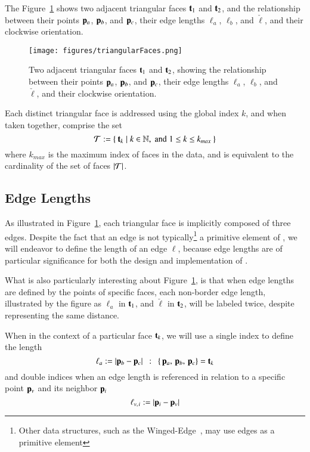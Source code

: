 The Figure~\ref{fig:triangularFaces} shows two adjacent triangular faces $\mathbf{t}_1$ and $\mathbf{t}_2$, and the relationship between their points $\mathbf{p}_a$, $\mathbf{p}_b$, and $\mathbf{p}_c$, their edge lengths $\ell_a$, $\ell_b$, and $\check{\ell}$, and their clockwise orientation.

\begin{figure}
\ffigbox
	{\texttt{[image: figures/triangularFaces.png]}}
	{\caption[Two Triangular Faces]{Two adjacent triangular faces $\mathbf{t}_1$ and $\mathbf{t}_2$, showing the relationship between their points $\mathbf{p}_a$, $\mathbf{p}_b$, and $\mathbf{p}_c$, their edge lengths $\ell_a$, $\ell_b$, and $\check{\ell}$, and their clockwise orientation.}\label{fig:triangularFaces}}
\end{figure}

Each distinct triangular face is addressed using the global index $k$, and when taken together, comprise the set
%
\begin{equation}
	\mathcal{T} := \left \{\:\mathbf{t}_k \mid k \in \mathbb{N}, \;\text{and}\; 1\leq k \leq k_{max}\:\right \}
	\label{eq:defineSetOfFaces}
\end{equation}
%
where $k_{max}$ is the maximum index of faces in the data, and is equivalent to the cardinality of the set of faces $|\mathcal{T}|$.%
%
%

%
%
%
\subsection{Edge Lengths}
\label{ch2s3ssEL}
As illustrated in Figure~\ref{fig:triangularFaces}, each triangular face is implicitly composed of three edges. Despite the fact that an edge is not typically\footnote{Other data structures, such as the Winged-Edge~\cite[p.~1]{Baumgart75}, may use edges as a primitive element} a primitive element of \tdd{}, we will endeavor to define the length of an edge $\ell$, because edge lengths are of particular significance for both the design and implementation of .

What is also particularly interesting about Figure~\ref{fig:triangularFaces}, is that when edge lengths are defined by the points of specific faces, each non-border edge length, illustrated by the figure as $\ell_a$ in $\mathbf{t}_1$, and $\check{\ell}$ in $\mathbf{t}_2$, will be labeled twice, despite representing the same distance.

When in the context of a particular face $\mathbf{t}_k$, we will use a single index to define the length
%
\begin{equation}
	\ell_a := |\mathbf{p}_b - \mathbf{p}_c| \enspace:\enspace \left \{\,\mathbf{p}_a,\,\mathbf{p}_b,\,\mathbf{p}_c\right \} = \mathbf{t}_k
	\label{eq:defineEdgeLengthFace}
\end{equation}%
%
%
and double indices when an edge length is referenced in relation to a specific point $\mathbf{p}_v$ and its neighbor $\mathbf{p}_i$
%
\begin{equation}
	\ell_{v,\kern.75pt i} := |\mathbf{p}_i - \mathbf{p}_v|
	\label{eq:defineEdgeLengthPoint}
\end{equation}%
%

